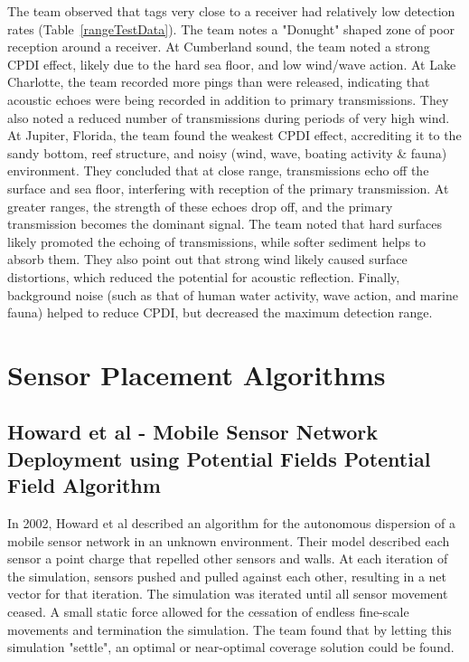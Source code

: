 The team observed that tags very close to a receiver had relatively low detection rates (Table~\ref{rangeTestData}).  The team notes a "Donught" shaped zone of poor reception around a receiver.  At Cumberland sound, the team noted a strong CPDI effect, likely due to the hard sea floor, and low wind/wave action.  At Lake Charlotte, the team recorded more pings than were released, indicating that acoustic echoes were being recorded in addition to primary transmissions.   They also noted a reduced number of transmissions during periods of very high wind.  At Jupiter, Florida, the team found the weakest CPDI effect, accrediting it to the sandy bottom, reef structure, and noisy (wind, wave, boating activity \& fauna) environment.  They concluded that at close range, transmissions echo off the surface and sea floor, interfering with reception of the primary transmission.  At greater ranges, the strength of these echoes drop off, and the primary transmission becomes the dominant signal.  The team noted that hard surfaces likely promoted the echoing of transmissions, while softer sediment helps to absorb them.  They also point out that strong wind likely caused surface distortions, which reduced the potential for acoustic reflection.  Finally, background noise (such as that of human water activity, wave action, and marine fauna) helped to reduce CPDI, but decreased the maximum detection range.


\section{Sensor Placement Algorithms}
\subsection{Howard et al - Mobile Sensor Network Deployment using Potential Fields Potential Field Algorithm}
In 2002, Howard et al described an algorithm for the autonomous dispersion of a mobile sensor network in an unknown environment.  Their model described each sensor a point charge that repelled other sensors and walls.  At each iteration of the simulation, sensors pushed and pulled against each other, resulting in a net vector for that iteration.  The simulation was iterated until all sensor movement ceased.  A small static force allowed for the cessation of endless fine-scale movements and termination the simulation.  The team found that by letting this simulation "settle", an optimal or near-optimal coverage solution could be found.  


